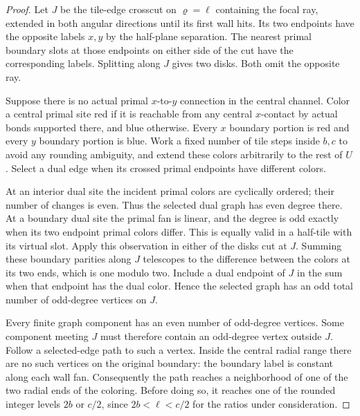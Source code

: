 \begin{proof}
Let $J$ be the tile-edge crosscut on $\varrho=\ell$ containing the focal
ray, extended in both angular directions until its first wall hits.
Its two endpoints have the opposite labels $x,y$ by the half-plane
separation.  The nearest primal boundary slots at those endpoints on
either side of the cut have the corresponding labels.  Splitting along
$J$ gives two disks.  Both omit the opposite ray.

Suppose there is no actual primal $x$-to-$y$ connection in the central
channel.  Color a central primal site red if it is reachable from any
central $x$-contact by actual bonds supported there, and blue otherwise.
Every $x$ boundary portion is red and every $y$ boundary portion is
blue.  Work a fixed number of tile steps inside $b,c$ to avoid any
rounding ambiguity, and extend these colors arbitrarily to the rest
of $U$.  Select a dual edge when its crossed primal endpoints have
different colors.

At an interior dual site the incident primal colors are cyclically
ordered; their number of changes is even.  Thus the selected dual
graph has even degree there.  At a boundary dual site the primal fan
is linear, and the degree is odd exactly when its two endpoint primal
colors differ.  This is equally valid in a half-tile with its virtual
slot.  Apply this observation in either of the disks cut at $J$.
Summing these boundary parities along $J$ telescopes to the difference
between the colors at its two ends, which is one modulo two.  Include
a dual endpoint of $J$ in the sum when that endpoint has the dual
color.  Hence the selected graph has an odd total number of odd-degree
vertices on $J$.

Every finite graph component has an even number of odd-degree
vertices.  Some component meeting $J$ must therefore contain an
odd-degree vertex outside $J$.  Follow a selected-edge path to such
a vertex.  Inside the central radial range there are no such vertices
on the original boundary: the boundary label is constant along each
wall fan.  Consequently the path reaches a neighborhood of one of the
two radial ends of the coloring.  Before doing so, it reaches one of
the rounded integer levels $2b$ or $c/2$, since
$2b<\ell<c/2$ for the ratios under consideration.


\end{proof}
